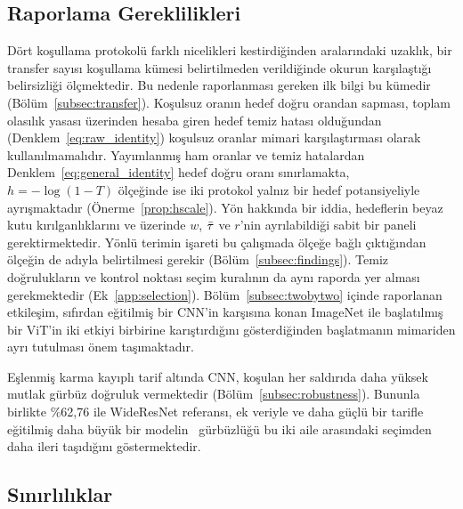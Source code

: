 \subsection{Raporlama Gereklilikleri}
\label{subsec:implications}

Dört koşullama protokolü farklı nicelikleri kestirdiğinden aralarındaki uzaklık, bir transfer sayısı koşullama kümesi belirtilmeden verildiğinde okurun karşılaştığı belirsizliği ölçmektedir. Bu nedenle raporlanması gereken ilk bilgi bu kümedir (Bölüm~\ref{subsec:transfer}). Koşulsuz oranın hedef doğru orandan sapması, toplam olasılık yasası üzerinden hesaba giren hedef temiz hatası olduğundan (Denklem~\eqref{eq:raw_identity}) koşulsuz oranlar mimari karşılaştırması olarak kullanılmamalıdır. Yayımlanmış ham oranlar ve temiz hatalardan Denklem~\eqref{eq:general_identity} hedef doğru oranı sınırlamakta, $h=-\log(1-T)$ ölçeğinde ise iki protokol yalnız bir hedef potansiyeliyle ayrışmaktadır (Önerme~\ref{prop:hscale}). Yön hakkında bir iddia, hedeflerin beyaz kutu kırılganlıklarını ve üzerinde $w$, $\bar{\tau}$ ve $r$'nin ayrılabildiği sabit bir paneli gerektirmektedir. Yönlü terimin işareti bu çalışmada ölçeğe bağlı çıktığından ölçeğin de adıyla belirtilmesi gerekir (Bölüm~\ref{subsec:findings}). Temiz doğrulukların ve kontrol noktası seçim kuralının da aynı raporda yer alması gerekmektedir (Ek~\ref{app:selection}). Bölüm~\ref{subsec:twobytwo} içinde raporlanan etkileşim, sıfırdan eğitilmiş bir CNN'in karşısına konan ImageNet ile başlatılmış bir ViT'in iki etkiyi birbirine karıştırdığını gösterdiğinden başlatmanın mimariden ayrı tutulması önem taşımaktadır.

Eşlenmiş karma kayıplı tarif altında CNN, koşulan her saldırıda daha yüksek mutlak gürbüz doğruluk vermektedir (Bölüm~\ref{subsec:robustness}). Bununla birlikte \%62{,}76 ile WideResNet referansı, ek veriyle ve daha güçlü bir tarifle eğitilmiş daha büyük bir modelin~\cite{gowal2020uncovering} gürbüzlüğü bu iki aile arasındaki seçimden daha ileri taşıdığını göstermektedir.

\subsection{Sınırlılıklar}
\label{subsec:limitations}

